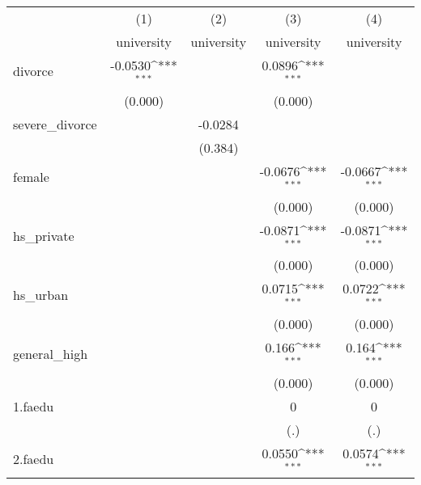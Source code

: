 {
\def\sym#1{\ifmmode^{#1}\else\(^{#1}\)\fi}
\begin{tabular}{l*{4}{c}}
\hline\hline
            &\multicolumn{1}{c}{(1)}&\multicolumn{1}{c}{(2)}&\multicolumn{1}{c}{(3)}&\multicolumn{1}{c}{(4)}\\
            &\multicolumn{1}{c}{university}&\multicolumn{1}{c}{university}&\multicolumn{1}{c}{university}&\multicolumn{1}{c}{university}\\
\hline
divorce     &     -0.0530\sym{***}&                     &      0.0896\sym{***}&                     \\
            &     (0.000)         &                     &     (0.000)         &                     \\
[1em]
severe\_divorce&                     &     -0.0284         &                     &                     \\
            &                     &     (0.384)         &                     &                     \\
[1em]
female      &                     &                     &     -0.0676\sym{***}&     -0.0667\sym{***}\\
            &                     &                     &     (0.000)         &     (0.000)         \\
[1em]
hs\_private  &                     &                     &     -0.0871\sym{***}&     -0.0871\sym{***}\\
            &                     &                     &     (0.000)         &     (0.000)         \\
[1em]
hs\_urban    &                     &                     &      0.0715\sym{***}&      0.0722\sym{***}\\
            &                     &                     &     (0.000)         &     (0.000)         \\
[1em]
general\_high&                     &                     &       0.166\sym{***}&       0.164\sym{***}\\
            &                     &                     &     (0.000)         &     (0.000)         \\
[1em]
1.faedu     &                     &                     &           0         &           0         \\
            &                     &                     &         (.)         &         (.)         \\
[1em]
2.faedu     &                     &                     &      0.0550\sym{***}&      0.0574\sym{***}\\

\end{tabular}}
